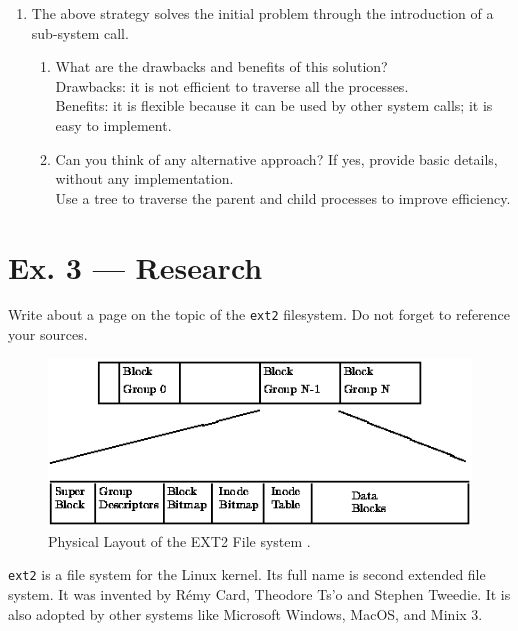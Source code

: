 \documentclass[a4paper]{article}
\begin{document}
\begin{enumerate}
\begin{verbatim}
  getchpid(n_children, p_children);
  
  for (i = 0; i < n_children; i++) {
    if (p_children_std[i] != p_children[i]) {
      fprintf(stderr, "Wrong answer %d\n", i);
    }
  }

  return 0;
}
    \end{verbatim}
    \item The above strategy solves the initial problem through the introduction of a sub-system call.
    \begin{enumerate}
        \item What are the drawbacks and benefits of this solution?\\
        Drawbacks: it is not efficient to traverse all the processes.\\
        Benefits: it is flexible because it can be used by other system calls; it is easy to implement.
        \item Can you think of any alternative approach? If yes, provide basic details, without any implementation.\\
        Use a tree to traverse the parent and child processes to improve efficiency.
    \end{enumerate}
\end{enumerate}
\section*{Ex. 3 — Research}
Write about a page on the topic of the \texttt{ext2} filesystem. Do not forget to reference your sources.
\begin{figure}[H]
    \centering
    \includegraphics[width=1\textwidth]{1.png}
    \caption{Physical Layout of the EXT2 File system \cite{science}.}
\end{figure}
\texttt{ext2} is a file system for the Linux kernel. Its full name is second extended file system. It was invented by Rémy Card, Theodore Ts'o and Stephen Tweedie. It is also adopted by other systems like Microsoft Windows, MacOS, and Minix 3.
\end{document}
